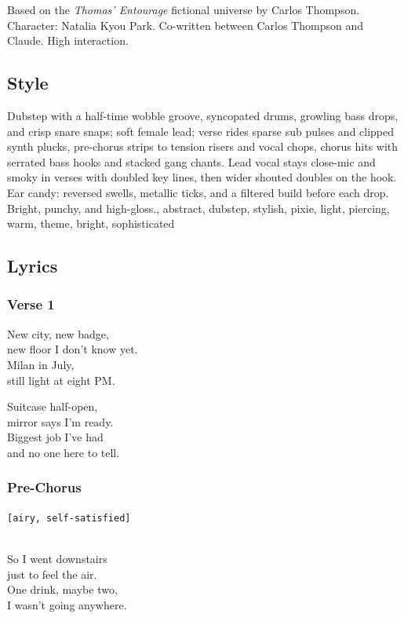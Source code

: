 Based on the \emph{Thomas' Entourage} fictional universe by Carlos
Thompson. Character: Natalia Kyou Park. Co-written between Carlos
Thompson and Claude. High interaction.

\subsection{Style}\label{style-20}

Dubstep with a half-time wobble groove, syncopated drums, growling bass
drops, and crisp snare snaps; soft female lead; verse rides sparse sub
pulses and clipped synth plucks, pre-chorus strips to tension risers and
vocal chops, chorus hits with serrated bass hooks and stacked gang
chants. Lead vocal stays close-mic and smoky in verses with doubled key
lines, then wider shouted doubles on the hook. Ear candy: reversed
swells, metallic ticks, and a filtered build before each drop. Bright,
punchy, and high-gloss., abstract, dubstep, stylish, pixie, light,
piercing, warm, theme, bright, sophisticated

\subsection{Lyrics}\label{lyrics-20}

\subsubsection{Verse 1}\label{verse-1-16}

New city, new badge,\\
new floor I don't know yet.\\
Milan in July,\\
still light at eight PM.

Suitcase half-open,\\
mirror says I'm ready.\\
Biggest job I've had\\
and no one here to tell.

\subsubsection{Pre-Chorus}\label{pre-chorus-37}

\texttt{{[}airy,\ self-satisfied{]}}\strut \\
So I went downstairs\\
just to feel the air.\\
One drink, maybe two,\\
I wasn't going anywhere.

